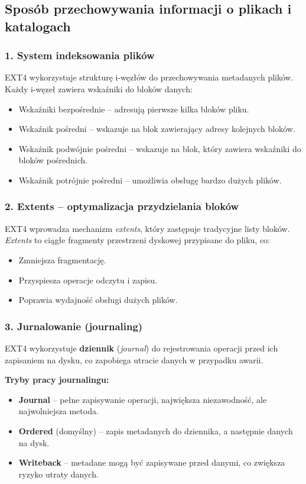 \subsection{Sposób przechowywania informacji o plikach i katalogach}

\subsubsection{1. System indeksowania plików}
EXT4 wykorzystuje strukturę i-węzłów do przechowywania metadanych plików. Każdy i-węzeł zawiera wskaźniki do bloków danych:
\begin{itemize}
    \item Wskaźniki bezpośrednie – adresują pierwsze kilka bloków pliku.
    \item Wskaźnik pośredni – wskazuje na blok zawierający adresy kolejnych bloków.
    \item Wskaźnik podwójnie pośredni – wskazuje na blok, który zawiera wskaźniki do bloków pośrednich.
    \item Wskaźnik potrójnie pośredni – umożliwia obsługę bardzo dużych plików.
\end{itemize}

\subsubsection{2. Extents – optymalizacja przydzielania bloków}
EXT4 wprowadza mechanizm \textit{extents}, który zastępuje tradycyjne listy bloków. \textit{Extents} to ciągłe fragmenty przestrzeni dyskowej przypisane do pliku, co:
\begin{itemize}
    \item Zmniejsza fragmentację.
    \item Przyspiesza operacje odczytu i zapisu.
    \item Poprawia wydajność obsługi dużych plików.
\end{itemize}

\subsubsection{3. Jurnalowanie (journaling)}
EXT4 wykorzystuje \textbf{dziennik} (\textit{journal}) do rejestrowania operacji przed ich zapisaniem na dysku, co zapobiega utracie danych w przypadku awarii.

\textbf{Tryby pracy journalingu:}
\begin{itemize}
    \item \textbf{Journal} – pełne zapisywanie operacji, największa niezawodność, ale najwolniejsza metoda.
    \item \textbf{Ordered} (domyślny) – zapis metadanych do dziennika, a następnie danych na dysk.
    \item \textbf{Writeback} – metadane mogą być zapisywane przed danymi, co zwiększa ryzyko utraty danych.
\end{itemize}

